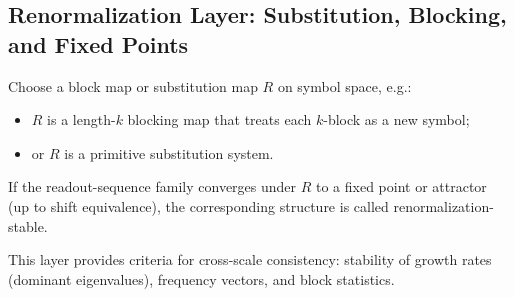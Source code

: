 \subsection{Renormalization Layer: Substitution, Blocking, and Fixed Points}

\begin{definition}
Choose a block map or substitution map $R$ on symbol space, e.g.:
\begin{itemize}
  \item $R$ is a length-$k$ blocking map that treats each $k$-block as a new symbol;
  \item or $R$ is a primitive substitution system.
\end{itemize}
\end{definition}

\begin{definition}
If the readout-sequence family converges under $R$ to a fixed point or attractor (up to shift equivalence), the corresponding structure is called renormalization-stable.
\end{definition}

This layer provides criteria for cross-scale consistency: stability of growth rates (dominant eigenvalues), frequency vectors, and block statistics.
